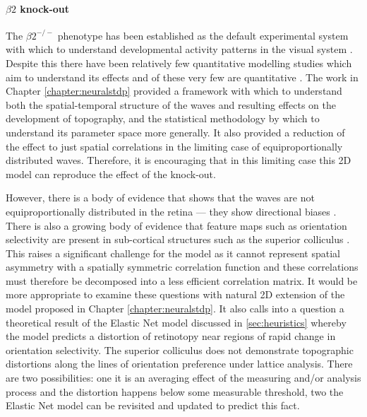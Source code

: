 \paragraph{$\beta2$ knock-out}
The $\beta2^{-/-}$ phenotype has been established as the default experimental system with which to understand developmental activity patterns in the visual system \cite{Seabrook2017-fa, Burbridge2014-ib, Zhang2017-hs, Xu2015-uc}. Despite this there have been relatively few quantitative modelling studies which aim to understand its effects and of these very few are quantitative \cite{Lyngholm2019-fs, Tikidji-Hamburyan2016-sn, Godfrey2009-ts}. The work in Chapter \ref{chapter:neuralstdp} provided a framework with which to understand both the spatial-temporal structure of the waves and resulting effects on the development of topography, and the statistical methodology by which to understand its parameter space more generally. It also provided a reduction of the effect to just spatial correlations in the limiting case of equiproportionally distributed waves. Therefore, it is encouraging that in this limiting case this 2D model can reproduce the effect of the knock-out. 

However, there is a body of evidence that shows that the waves are not equiproportionally distributed in the retina --- they show directional biases \cite{Ackman2012-uu, Ackman2014-tj}. There is also a growing body of evidence that feature maps such as orientation selectivity are present in sub-cortical structures such as the superior colliculus \cite{Ahmadlou2015-jw, Feinberg2015-eu}. This raises a significant challenge for the model as it cannot represent spatial asymmetry with a spatially symmetric correlation function and these correlations must therefore be decomposed into a less efficient correlation matrix. It would be more appropriate to examine these questions with natural 2D extension of the model proposed in Chapter \ref{chapter:neuralstdp}. It also calls into a question a theoretical result of the Elastic Net model discussed in \ref{sec:heuristics} whereby the model predicts a distortion of retinotopy near regions of rapid change in orientation selectivity. The superior colliculus does not demonstrate topographic distortions along the lines of orientation preference under lattice analysis. There are two possibilities: one it is an averaging effect of the measuring and/or analysis process and the distortion happens below some measurable threshold, two the Elastic Net model can be revisited and updated to predict this fact.
